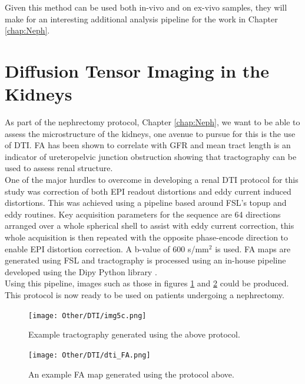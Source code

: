 Given this method can be used both in-vivo and on ex-vivo samples, they will make for an interesting additional analysis pipeline for the work in Chapter \ref{chap:Neph}.

\newpage
\section{Diffusion Tensor Imaging in the Kidneys}
\label{sec:dti}
As part of the nephrectomy protocol, Chapter \ref{chap:Neph}, we want to be able to assess the microstructure of the kidneys, one avenue to pursue for this is the use of \ac{DTI}. \ac{FA} has been shown to correlate with \ac{GFR} \cite{liu_chronic_2015} and mean tract length is an indicator of ureteropelvic junction obstruction \cite{delgado_pilot_2019} showing that tractography can be used to assess renal structure.\\

One of the major hurdles to overcome in developing a renal \ac{DTI} protocol for this study was correction of both \ac{EPI} readout distortions and eddy current induced distortions. This was achieved using a pipeline based around \ac{FSL}'s topup \cite{andersson_how_2003, smith_advances_2004} and eddy \cite{andersson_integrated_2016} routines. Key acquisition parameters for the sequence are 64 directions arranged over a whole spherical shell to assist with eddy current correction, this whole acquisition is then repeated with the opposite phase-encode direction to enable \ac{EPI} distortion correction. A b-value of 600 s/mm$^2$ is used. \ac{FA} maps are generated using \ac{FSL} and tractography is processed using an in-house pipeline developed using the Dipy Python library \cite{garyfallidis_dipy_2014}.\\

Using this pipeline, images such as those in figures \ref{fig:dti_tracts} and \ref{fig:dti_fa} could be produced. This protocol is now ready to be used on patients undergoing a nephrectomy.

\begin{figure}[H]
	\centering
	\texttt{[image: Other/DTI/img5c.png]}
	\caption{Example tractography generated using the above protocol.}
	\label{fig:dti_tracts}
\end{figure}

\begin{figure}[H]
	\centering
	\texttt{[image: Other/DTI/dti\_FA.png]}
	\caption{An example \ac{FA} map generated using the protocol above.}
	\label{fig:dti_fa}
\end{figure}

